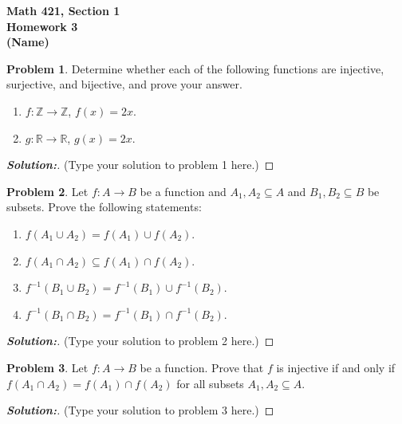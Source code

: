 \documentclass[12pt]{article}
\theoremstyle{definition}\newtheorem{problem}{Problem}
\newenvironment{solution}{\begin{proof}[\bfseries\textup{Solution:}]}{\end{proof}}
\newcommand{\Z}{\mathbb{Z}}
\newcommand{\R}{\mathbb{R}}
\begin{document}

\begin{center}
\bfseries Math 421, Section 1 
\\ 
Homework 3
\\ 
(Name) %
\\ [24pt] 
\end{center}

\begin{problem}
Determine whether each of the following functions are injective, surjective, and bijective, and prove your answer.
\begin{enumerate}
\item $f:\Z\to\Z$, $f(x) = 2x$.  %
\item $g:\R\to\R$, $g(x) = 2x$.  %
\end{enumerate}
\end{problem}
\begin{solution}
(Type your solution to problem 1 here.)
\end{solution}

\newpage
\begin{problem}
Let $f:A\to B$ be a function and $A_1,A_2\subseteq A$ and $B_1,B_2\subseteq B$ be subsets.  Prove the following statements:
\begin{enumerate}
\item $f(A_1\cup A_2) = f(A_1) \cup f(A_2)$.
\item $f(A_1\cap A_2) \subseteq f(A_1) \cap f(A_2)$.
\item $f^{-1}(B_1\cup B_2) = f^{-1}(B_1) \cup f^{-1}(B_2)$.
\item $f^{-1}(B_1\cap B_2) = f^{-1}(B_1) \cap f^{-1}(B_2)$.
\end{enumerate}
\end{problem}
\begin{solution}
(Type your solution to problem 2 here.)
\end{solution}

\newpage
\begin{problem}
Let $f:A\to B$ be a function.  Prove that $f$ is injective if and only if $f(A_1\cap A_2) = f(A_1) \cap f(A_2)$ for all subsets $A_1,A_2\subseteq A$.
\end{problem}
\begin{solution}
(Type your solution to problem 3 here.)
\end{solution}
\end{document}
